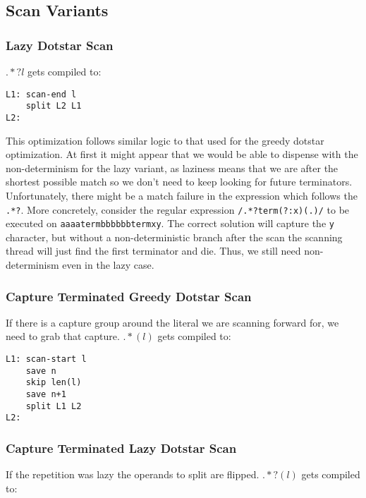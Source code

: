 
\subsection{Scan Variants}

\subsubsection{Lazy Dotstar Scan}

$.*?l$ gets compiled to:

\begin{verbatim}
L1: scan-end l
    split L2 L1
L2: 
\end{verbatim}

\noindent
This optimization follows similar logic to that used for the greedy
dotstar optimization. At first it might appear that we would be able
to dispense with the non-determinism for the lazy variant, as laziness
means that we are after the shortest possible match so we don't
need to keep looking for future terminators. Unfortunately, there
might be a match failure in the expression which follows the
\verb'.*?'. More concretely, consider the regular expression
\verb'/.*?term(?:x)(.)/'
to be executed on \verb'aaaatermbbbbbbtermxy'. The correct solution will
capture the \verb'y' character, but without a non-deterministic branch
after the scan the scanning thread will just find the first terminator and
die. Thus, we still need non-determinism even in the lazy case.

\subsubsection{Capture Terminated Greedy Dotstar Scan}
  \label{capterm}

If there is a capture group around the literal we are scanning forward
for, we need to grab that capture. $.*(l)$ gets compiled to:

\begin{verbatim}
L1: scan-start l
    save n
    skip len(l)
    save n+1
    split L1 L2
L2: 
\end{verbatim}

\subsubsection{Capture Terminated Lazy Dotstar Scan}

If the repetition was lazy the operands to split are flipped.
$.*?(l)$ gets compiled to:

